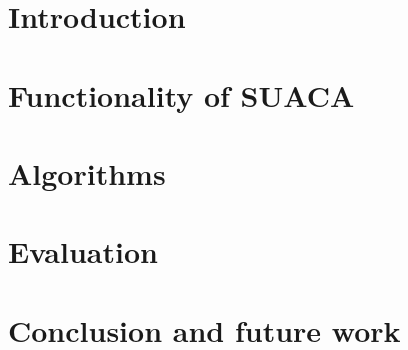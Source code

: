 \documentclass[a4paper,12pt,titlepage, twoside]{report}
\begin{document}
\setlength{\oddsidemargin}{\dimexpr (\paperwidth-\textwidth)/2 - 1in\relax}
\setlength{\evensidemargin}{\oddsidemargin}



\setcounter{page}{0}
\tableofcontents 



\chapter{Introduction}






\chapter{Functionality of SUACA}
\label{chap:functionality}






\chapter{Algorithms}
\label{chap:algorithms}





\chapter{Evaluation}
\label{chap:eval}





\chapter{Conclusion and future work}




\printbibliography
\end{document}
